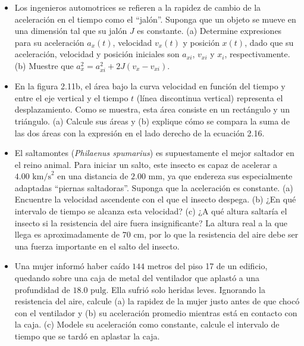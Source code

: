 \documentclass[11pt,a4paper]{article}
\begin{document}
\begin{itemize}
    \item[\textbf{33.}] Los ingenieros automotrices se refieren a la rapidez de cambio de la aceleración en el tiempo como el ``jalón''. Suponga que un objeto se mueve en una dimensión tal que su jalón $J$ es constante. (a) Determine expresiones para su aceleración $a_x(t)$, velocidad $v_{x}(t)$ y posición $x(t)$, dado que su aceleración, velocidad y posición iniciales son $a_{xi}$, $v_{xi}$ y $x_i$, respectivamente. (b) Muestre que $a_x^2 = a_{xi}^2 + 2J(v_x - v_{xi})$.
    \vspace*{7cm}

    \item[\textbf{34.}] En la figura 2.11b, el área bajo la curva velocidad en función del tiempo y entre el eje vertical y el tiempo $t$ (línea discontinua vertical) representa el desplazamiento. Como se muestra, esta área consiste en un rectángulo y un triángulo. (a) Calcule sus áreas y (b) explique cómo se compara la suma de las dos áreas con la expresión en el lado derecho de la ecuación 2.16.
    \vspace*{6cm}

    \item[\textbf{35.}] El saltamontes (\textit{Philaenus spumarius}) es supuestamente el mejor saltador en el reino animal. Para iniciar un salto, este insecto es capaz de acelerar a $4.00 \text{ km/s}^2$ en una distancia de $2.00 \text{ mm}$, ya que endereza sus especialmente adaptadas ``piernas saltadoras''. Suponga que la aceleración es constante. (a) Encuentre la velocidad ascendente con el que el insecto despega. (b) ¿En qué intervalo de tiempo se alcanza esta velocidad? (c) ¿A qué altura saltaría el insecto si la resistencia del aire fuera insignificante? La altura real a la que llega es aproximadamente de $70 \text{ cm}$, por lo que la resistencia del aire debe ser una fuerza importante en el salto del insecto.
    \vspace*{6cm}

    \item[\textbf{36.}] Una mujer informó haber caído $144$ metros del piso 17 de un edificio, quedando sobre una caja de metal del ventilador que aplastó a una profundidad de $18.0 \text{ pulg}$. Ella sufrió solo heridas leves. Ignorando la resistencia del aire, calcule (a) la rapidez de la mujer justo antes de que chocó con el ventilador y (b) su aceleración promedio mientras está en contacto con la caja. (c) Modele su aceleración como constante, calcule el intervalo de tiempo que se tardó en aplastar la caja.
    \vspace*{6cm}
\end{itemize}
\end{document}
